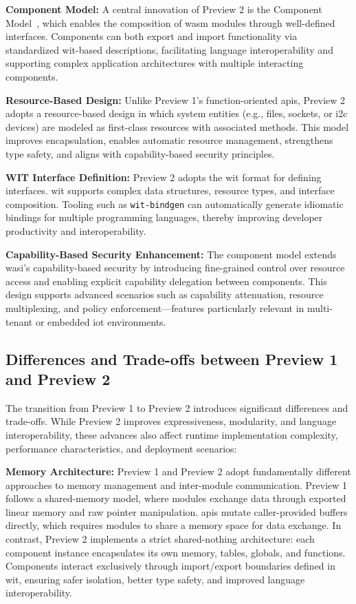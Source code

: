 \textbf{Component Model:} A central innovation of Preview 2 is the Component Model~\cite{wasi_component_model}, which enables the composition of \acrshort{wasm} modules through well-defined interfaces. Components can both export and import functionality via standardized \acrshort{wit}-based descriptions, facilitating language interoperability and supporting complex application architectures with multiple interacting components.

\textbf{Resource-Based Design:} Unlike Preview 1’s function-oriented \acrshort{api}s, Preview 2 adopts a resource-based design in which system entities (e.g., files, sockets, or \acrshort{i2c} devices) are modeled as first-class resources with associated methods. This model improves encapsulation, enables automatic resource management, strengthens type safety, and aligns with capability-based security principles.

\textbf{WIT Interface Definition:} Preview 2 adopts the \acrshort{wit} format for defining interfaces. \acrshort{wit} supports complex data structures, resource types, and interface composition. Tooling such as \sloppy\texttt{wit-bindgen} can automatically generate idiomatic bindings for multiple programming languages, thereby improving developer productivity and interoperability.

\textbf{Capability-Based Security Enhancement:} The component model extends \acrshort{wasi}'s capability-based security by introducing fine-grained control over resource access and enabling explicit capability delegation between components. This design supports advanced scenarios such as capability attenuation, resource multiplexing, and policy enforcement—features particularly relevant in multi-tenant or embedded \acrshort{iot} environments.

\subsection{Differences and Trade-offs between Preview 1 and Preview 2}
\label{subsec:preview-differences}
The transition from Preview 1 to Preview 2 introduces significant differences and trade-offs. While Preview 2 improves expressiveness, modularity, and language interoperability, these advances also affect runtime implementation complexity, performance characteristics, and deployment scenarios:

\textbf{Memory Architecture:} Preview 1 and Preview 2 adopt fundamentally different approaches to memory management and inter-module communication. Preview 1 follows a shared-memory model, where modules exchange data through exported linear memory and raw pointer manipulation. \acrshort{api}s mutate caller-provided buffers directly, which requires modules to share a memory space for data exchange. In contrast, Preview 2 implements a strict shared-nothing architecture: each component instance encapsulates its own memory, tables, globals, and functions. Components interact exclusively through import/export boundaries defined in \acrshort{wit}, ensuring safer isolation, better type safety, and improved language interoperability.

